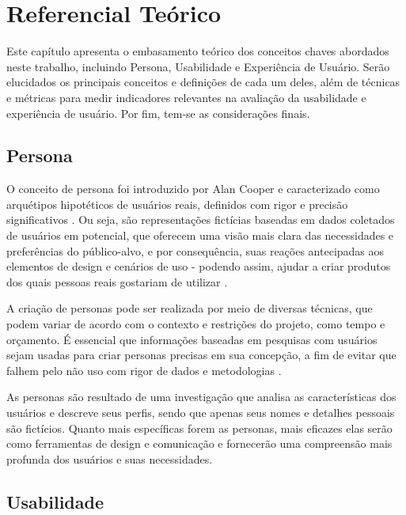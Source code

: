 \chapter[Referencial Teórico]{Referencial Teórico}

Este capítulo apresenta o embasamento teórico dos conceitos chaves abordados
neste trabalho, incluindo Persona, Usabilidade e Experiência de Usuário. Serão
elucidados os principais conceitos e definições de cada um deles, além de 
técnicas e métricas para medir indicadores relevantes na avaliação da 
usabilidade e experiência de usuário. Por fim, tem-se as considerações finais.

\section{Persona}
\label{sec:Persona}

O conceito de persona foi introduzido por Alan Cooper e caracterizado como 
arquétipos hipotéticos de usuários reais, definidos com rigor e precisão 
significativos \cite{cooper1999}. Ou seja, são representações fictícias 
baseadas em dados coletados de usuários em potencial, que oferecem uma visão 
mais clara das necessidades e preferências do público-alvo, e por consequência, 
suas reações antecipadas aos elementos de design e cenários de uso - podendo 
assim, ajudar a criar produtos dos quais pessoas reais gostariam de utilizar 
\cite{pruitt2006}.

A criação de personas pode ser realizada por meio de diversas técnicas, que 
podem variar de acordo com o contexto e restrições do projeto, como tempo e 
orçamento. É essencial que informações baseadas em pesquisas com usuários sejam 
usadas para criar personas precisas em sua concepção, a fim de evitar que falhem 
pelo não uso com rigor de dados e metodologias \cite{pruitt2006}.

As personas são resultado de uma investigação que analisa as características dos 
usuários e descreve seus perfis, sendo que apenas seus nomes e detalhes pessoais 
são fictícios. Quanto mais específicas forem as personas, mais eficazes elas serão 
como ferramentas de design e comunicação e fornecerão uma compreensão mais profunda 
dos usuários e suas necessidades. \cite{barbosa2010}

\section{Usabilidade}
\label{sec:Usabilidade}

